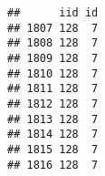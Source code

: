 \documentclass[]{article}
\newenvironment{Shaded}{\begin{snugshade}}{\end{snugshade}}
\newcommand{\KeywordTok}[1]{\textcolor[rgb]{0.13,0.29,0.53}{\textbf{#1}}}
\newcommand{\DecValTok}[1]{\textcolor[rgb]{0.00,0.00,0.81}{#1}}
\newcommand{\StringTok}[1]{\textcolor[rgb]{0.31,0.60,0.02}{#1}}
\newcommand{\CommentTok}[1]{\textcolor[rgb]{0.56,0.35,0.01}{\textit{#1}}}
\newcommand{\OperatorTok}[1]{\textcolor[rgb]{0.81,0.36,0.00}{\textbf{#1}}}
\newcommand{\NormalTok}[1]{#1}
\begin{document}
\begin{Shaded}
\end{Shaded}

\begin{verbatim}
##      iid id
## 1807 128  7
## 1808 128  7
## 1809 128  7
## 1810 128  7
## 1811 128  7
## 1812 128  7
## 1813 128  7
## 1814 128  7
## 1815 128  7
## 1816 128  7
\end{verbatim}
\end{document}
